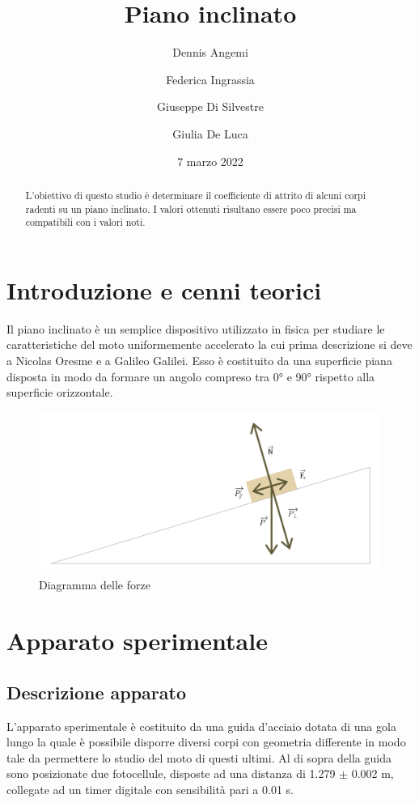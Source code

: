 \documentclass[11pt,a4paper]{article}
\title{Piano inclinato}
\author[1]{Dennis Angemi}%
\author[1]{Federica Ingrassia}%
\author[1]{Giuseppe Di Silvestre}%
\author[1]{Giulia De Luca}%
\affil[1]{Dipartimento di Fisica e Astronomia ``Ettore Majorana'' - Università degli Studi di Catania}%
\date{7 marzo 2022}
\begin{document}
\maketitle

\begin{abstract}
    L'obiettivo di questo studio è determinare il coefficiente di attrito di alcuni corpi radenti su un piano inclinato. I valori ottenuti risultano essere poco precisi ma compatibili con i valori noti.
\end{abstract}

\section{Introduzione e cenni teorici}
Il piano inclinato è un semplice dispositivo utilizzato in fisica per studiare le caratteristiche del moto uniformemente accelerato la cui prima descrizione si deve a Nicolas Oresme e a Galileo Galilei. Esso è costituito da una superficie piana disposta in modo da formare un angolo compreso tra 0° e 90° rispetto alla superficie orizzontale.

\begin{figure}[H]
\includegraphics[scale=0.15]{force-diagram.png}
\centering
\caption{Diagramma delle forze}
\label{fig:forze}
\end{figure}

\section{Apparato sperimentale}

\subsection{Descrizione apparato}
L'apparato sperimentale è costituito da una guida d'acciaio dotata di una gola lungo la quale è possibile disporre diversi corpi con geometria differente in modo tale da permettere lo studio del moto di questi ultimi. Al di sopra della guida sono posizionate due fotocellule, disposte ad una distanza di 1.279 $\pm$ 0.002 m, collegate ad un timer digitale con sensibilità pari a 0.01 s.
\end{document}
